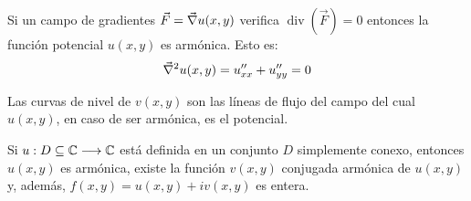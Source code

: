 \begin{mdframed}[style=PropertyFrame]
    \begin{prop}
    \end{prop}
    Si un campo de gradientes $\Vec{F}=\Vec{\nabla} u(x,y)$ verifica $\operatorname{div}(\Vec{F})=0$ entonces la función potencial $u(x,y)$ es armónica.
    Esto es:
    \begin{equation*}
        \Vec{\nabla}^2 u(x,y) = u_{xx}'' + u_{yy}'' = 0
    \end{equation*}
\end{mdframed}

\begin{mdframed}[style=PropertyFrame]
    \begin{prop}
    \end{prop}
    Las curvas de nivel de $v(x,y)$ son las líneas de flujo del campo del cual $u(x,y)$, en caso de ser armónica, es el potencial.
\end{mdframed}

\begin{mdframed}[style=PropertyFrame]
    \begin{prop}
    \end{prop}
    Si $u: D \subseteq \mathbb{C} \longrightarrow \mathbb{C}$ está definida en un conjunto $D$ simplemente conexo, entonces $u(x,y)$ es armónica, existe la función $v(x,y)$ conjugada armónica de $u(x,y)$ y, además, $f(x,y)=u(x,y)+iv(x,y)$ es entera.
\end{mdframed}


